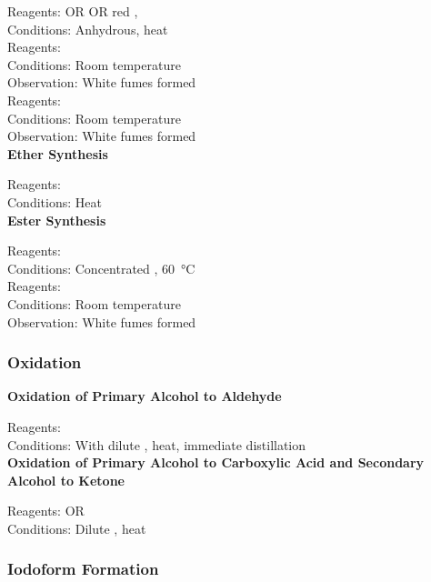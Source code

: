 \documentclass[../main]{subfiles}
\begin{document}
	Reagents:  OR  OR red ,  \\
	Conditions:  Anhydrous, heat \\

	Reagents:  \\
	Conditions:  Room temperature \\
	Observation: White fumes formed  \\

	Reagents:  \\
	Conditions:  Room temperature \\
	Observation: White fumes formed  \\

	\noindent \textbf{Ether Synthesis}

	Reagents:  \\
	Conditions:  Heat \\

	\noindent \textbf{Ester Synthesis}

	Reagents:  \\
	Conditions:  Concentrated , \SI{60}{\celsius} \\

	Reagents:  \\
	Conditions:  Room temperature \\
	Observation: White fumes formed  \\

	\subsubsection{Oxidation}

	\noindent \textbf{Oxidation of Primary Alcohol to Aldehyde}

	Reagents:  \\
	Conditions: With dilute , heat, immediate distillation \\

	\noindent \textbf{Oxidation of Primary Alcohol to Carboxylic Acid and Secondary Alcohol to Ketone}

	Reagents:  OR  \\
	Conditions: Dilute , heat \\

	\subsubsection{Iodoform Formation}
\end{document}
